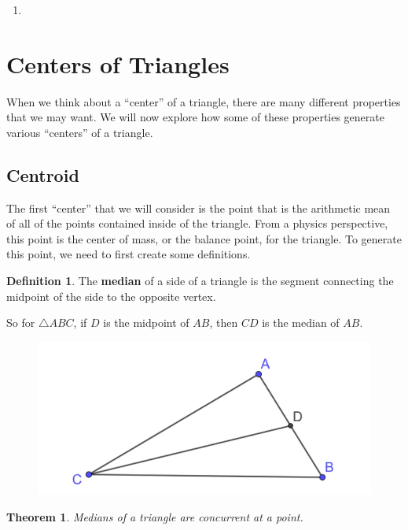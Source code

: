 \documentclass[
]{book}
\providecommand{\tightlist}{%
  \setlength{\itemsep}{0pt}\setlength{\parskip}{0pt}}
\let\stdsection\section
\renewcommand\section{\newpage\stdsection}
\newtheorem{theorem}{Theorem}[chapter]
\theoremstyle{definition}
\newtheorem{definition}{Definition}[chapter]
\theoremstyle{definition}
\theoremstyle{definition}
\theoremstyle{definition}
\theoremstyle{remark}
\begin{document}
\begin{enumerate}
\def\labelenumi{\arabic{enumi}.}
\tightlist
\item
\end{enumerate}

\hypertarget{centers-of-triangles}{%
\section{Centers of Triangles}\label{centers-of-triangles}}

When we think about a ``center'' of a triangle, there are many different properties that we may want. We will now explore how some of these properties generate various ``centers'' of a triangle.

\hypertarget{centroid}{%
\subsection{Centroid}\label{centroid}}

The first ``center'' that we will consider is the point that is the arithmetic mean of all of the points contained inside of the triangle. From a physics perspective, this point is the center of mass, or the balance point, for the triangle. To generate this point, we need to first create some definitions.

\begin{definition}
The \textbf{median} of a side of a triangle is the segment connecting the midpoint of the side to the opposite vertex.
\end{definition}

So for \(\triangle ABC\), if \(D\) is the midpoint of \(AB\), then \(CD\) is the median of \(AB\).

\begin{figure}

{\centering \includegraphics[width=0.3\linewidth]{images/median} 

}

\end{figure}

\begin{theorem}
Medians of a triangle are concurrent at a point.
\end{theorem}
\end{document}
